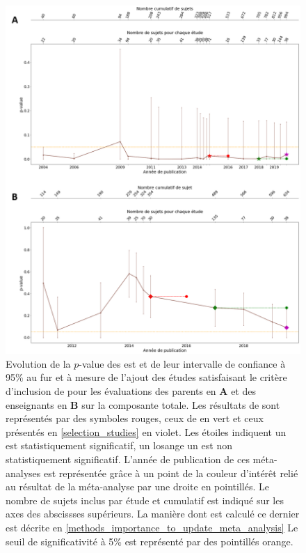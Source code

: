 \begin{figure}[h!]
  \centering
	\includegraphics[width=1\linewidth]{figures/chapter-2/meta-analysis-evolution-pvalue-total} 
  \caption[Evolution de la $p$-value des  au fur et à mesure de l'ajout de nouvelles études.]{Evolution de la $p$-value des \gls{est} et de leur intervalle de confiance à 95\% au fur et à mesure de l'ajout des études satisfaisant le critère d'inclusion de \citet{Cortese2016} pour les évaluations des 
	parents en \textbf{A} et des enseignants en \textbf{B} sur la composante totale.
  Les résultats de \citep{Cortese2016} sont représentés par des symboles rouges, ceux de \citet{Bussalb2016clinical} en vert et ceux présentés en \ref{selection_studies} en violet. Les étoiles 
	indiquent un \gls{est} statistiquement significatif, un losange un \gls{est} non statistiquement significatif. L'année de publication de ces méta-analyses est représentée grâce à un point de la couleur 
	d'intérêt relié au résultat de la méta-analyse par une droite en pointillés.
	Le nombre de sujets inclus par étude et cumulatif est indiqué sur les axes des abscissses supérieurs. La manière dont est calculé ce dernier est 
	décrite en \ref{methods_importance_to_update_meta_analysis}
	Le seuil de significativité à 5\% est représenté par des pointillés orange.}
  \label{Figure:meta_analysis_evolution_pvalue_total}
\end{figure}

